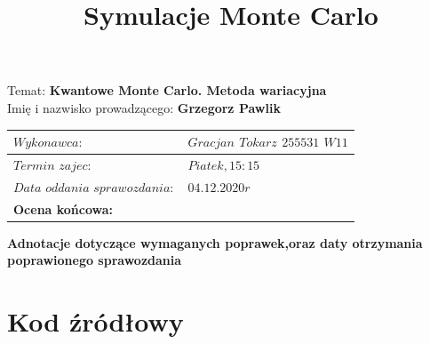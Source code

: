 \documentclass{article}
\title{Symulacje Monte Carlo}
\date{}
\begin{document}
\maketitle
Temat: \textbf{Kwantowe Monte Carlo. Metoda wariacyjna}\\
Imię i nazwisko prowadzącego: \textbf{Grzegorz Pawlik}

\begin{center}
\begin{tabular}{|p{5cm}|p{6cm}|}
\hline
$Wykonawca:$ & $Gracjan$ $Tokarz$ $255531$ $W11$  \\
\hline
$Termin$ $zajec:$ & $Piatek , 15:15$\\
\hline
$Data$ $oddania$ $sprawozdania:$ & $04.12.2020r$\\
\hline
\textbf{Ocena	końcowa:} & \\
\hline
\end{tabular}
\end{center}

\textbf{Adnotacje dotyczące wymaganych poprawek,oraz daty otrzymania poprawionego sprawozdania}

\newpage

\section{Kod źródłowy}
\end{document}

